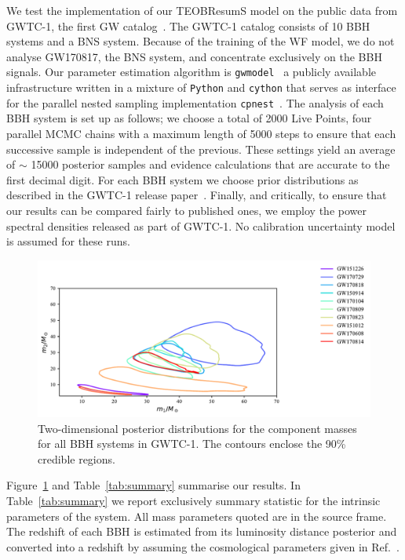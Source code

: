 We test the implementation of our TEOBResumS model on the public data from GWTC-1, the first GW catalog~\cite{}. 
The GWTC-1 catalog consists of 10 BBH systems and a BNS system. Because of the training of the WF model, we do not analyse GW170817, the BNS system, and concentrate exclusively on the BBH signals. Our parameter estimation algorithm is \texttt{gwmodel}~\cite{} a publicly available infrastructure 
written in a mixture of \texttt{Python} and \texttt{cython} that serves as interface for the parallel nested sampling implementation \texttt{cpnest}~\cite{}. 
The analysis of each BBH system is set up as follows; we choose a total of 2000 Live Points, four parallel MCMC chains with a maximum length of 5000 steps to ensure that each successive sample is independent of the previous. These settings yield an average of $\sim$ 15000 posterior samples and 
evidence calculations that are accurate to the first decimal digit. For each BBH system we choose prior distributions as described in the GWTC-1 release paper~\cite{}. Finally, and critically, to ensure that our results can be compared fairly to published ones, we employ the power spectral densities released as part of GWTC-1. No calibration uncertainty model is assumed for these runs. 
\begin{figure}[]
	\centering
    \includegraphics[width=.75\linewidth]{img/posterior_masses_source.pdf}
	\caption{
Two-dimensional posterior distributions for the component masses for all BBH systems in GWTC-1. The contours enclose the 90\% credible regions.
}
	\label{fig:summary-masses}
\end{figure}

Figure~\ref{fig:summary-masses} and Table~\ref{tab:summary} summarise our results. In Table~\ref{tab:summary} we report exclusively 
summary statistic for the intrinsic parameters of the system. All mass parameters quoted are in the source frame. The redshift of each BBH is estimated 
from its luminosity distance posterior and converted into a redshift by assuming the cosmological parameters given in Ref.~\cite{}.

